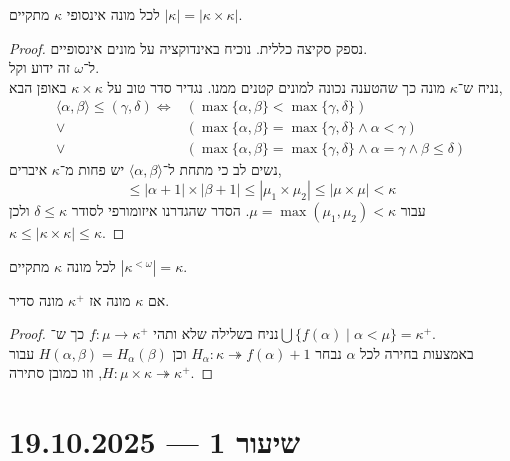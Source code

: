 \begin{proposition}
	לכל מונה אינסופי $\kappa$ מתקיים $|\kappa| = |\kappa \times \kappa|$.
\end{proposition}
\begin{proof}
	נספק סקיצה כללית.
	נוכיח באינדוקציה על מונים אינסופיים. \\
	ל־$\omega$ זה ידוע וקל. \\
	נניח ש־$\kappa$ מונה כך שהטענה נכונה למונים קטנים ממנו.
	נגדיר סדר טוב על $\kappa \times \kappa$ באופן הבא,
	\begin{align*}
		\langle \alpha, \beta \rangle \le (\gamma, \delta)
		\iff & (\max\{ \alpha, \beta \} < \max\{ \gamma, \delta \}) \\
		\lor & (\max\{ \alpha, \beta \} = \max\{ \gamma, \delta \} \land \alpha < \gamma) \\
		\lor & (\max\{ \alpha, \beta \} = \max\{ \gamma, \delta \} \land \alpha = \gamma \land \beta \le \delta)
	\end{align*}
	נשים לב כי מתחת ל־$\langle \alpha, \beta \rangle$ יש פחות מ־$\kappa$ איברים,
	\[
		\le |\alpha + 1| \times |\beta + 1|
		\le |\mu_1 \times \mu_2|
		\le |\mu \times \mu|
		< \kappa
	\]
	עבור $\mu = \max(\mu_1, \mu_2) < \kappa$.
	הסדר שהגדרנו איזומורפי לסודר $\delta \le \kappa$ ולכן $\kappa \le |\kappa \times \kappa| \le \kappa$.
\end{proof}
\begin{corollary}
	לכל מונה $\kappa$ מתקיים $|\kappa^{< \omega}| = \kappa$.
\end{corollary}
\begin{theorem}
	אם $\kappa$ מונה אז $\kappa^+$ מונה סדיר.
\end{theorem}
\begin{proof}
	נניח בשלילה שלא ותהי $f : \mu \to \kappa^+$ כך ש־$\bigcup \{ f(\alpha) \mid \alpha < \mu \} = \kappa^+$. \\
	באמצעות בחירה לכל $\alpha$ נבחר $H_{\alpha} : \kappa \twoheadrightarrow f(\alpha) + 1$ וכן $H(\alpha, \beta) = H_{\alpha}(\beta)$ עבור $H : \mu \times \kappa \twoheadrightarrow \kappa^+$, וזו כמובן סתירה.
\end{proof}

\section{שיעור 1 --- 19.10.2025}
